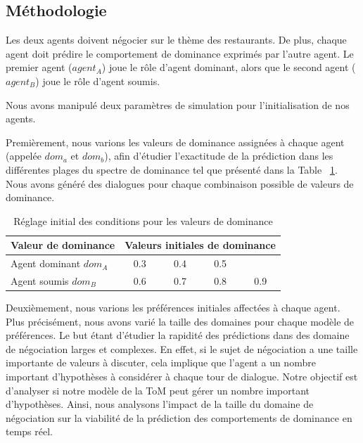 \subsection{Méthodologie}

Les deux agents doivent négocier sur le thème des restaurants. De plus, chaque agent doit prédire le comportement de dominance exprimés par l'autre agent.
Le premier agent ($ agent_A $) joue le rôle d'agent dominant, alors que le second agent ($ agent_B $) joue le rôle d'agent soumis.

Nous avons manipulé deux paramètres de simulation pour l'initialisation de nos agents.

Premièrement, nous varions les valeurs de dominance assignées à chaque agent (appelée \emph {$dom_a$} et \emph {$dom_b$}), afin d'étudier l'exactitude de la prédiction dans les différentes plages du spectre de dominance tel que présenté dans la Table ~\ref {tab:domsettings}. Nous avons généré des dialogues pour chaque combinaison possible de valeurs de dominance.

\begin{table}[h]
	\centering
	\caption{Réglage initial des conditions pour les valeurs de dominance} 
	\begin{tabular}{|l|cccc|}
		\hline 
		\textbf{Valeur de dominance} &	\multicolumn{4}{c|}{ Valeurs initiales de dominance} \\
		\hline
		Agent dominant $dom_A$ & 0.3 & 0.4 & 0.5 &  \\
		\hline
		Agent soumis $dom_B$ & 0.6 & 0.7 & 0.8 & 0.9\\
		\hline
	\end{tabular}
	
	\label{tab:domsettings}
\end{table}

Deuxièmement, nous varions les préférences initiales affectées à chaque agent. Plus précisément, nous avons varié la taille des domaines pour chaque modèle de préférences. Le but étant d'étudier la rapidité des prédictions dans des domaine de négociation larges et complexes. En effet, si le sujet de négociation a une taille importante de valeurs à discuter, cela implique que l'agent a un nombre important d'hypothèses à considérer à chaque tour de dialogue. Notre objectif est d'analyser si notre modèle de la ToM peut gérer un nombre important d'hypothèses. Ainsi, nous analysons  l'impact de la taille du domaine de négociation sur la viabilité de la prédiction des comportements de dominance en temps réel.

